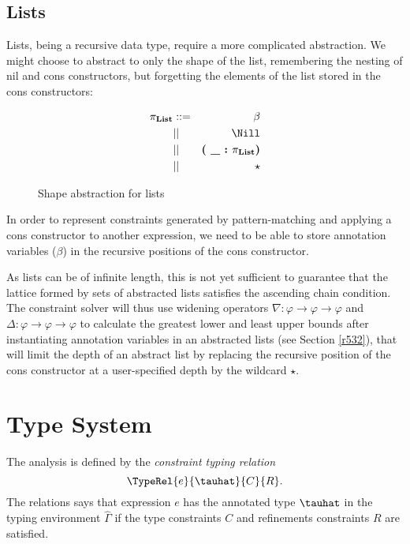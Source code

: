\subsection{Lists}

Lists, being a recursive data type, require a more complicated abstraction. We might choose to abstract to only the shape of the list, remembering the nesting of nil and cons constructors, but forgetting the elements of the list stored in the cons constructors:

\begin{figure}[h!t]
\begin{eqnarray*}
\pi_\mathbf{List} &::=& \beta                             \\
                  &||&  \Nill                             \\
                  &||&  \textbf{(\ \_\ :\ }\pi_\mathbf{List}\textbf{)} \\
                  &||&  \star
\end{eqnarray*}
\caption{Shape abstraction for lists}
\label{LatticeList}
\end{figure}

In order to represent constraints generated by pattern-matching and applying a cons constructor to another expression, we need to be able to store annotation variables ($\beta$) in the recursive positions of the cons constructor.

As lists can be of infinite length, this is not yet sufficient to guarantee that the lattice formed by sets of abstracted lists satisfies the ascending chain condition. The constraint solver will thus use widening operators $\nabla : \varphi \to \varphi \to \varphi$ and $\Delta : \varphi \to \varphi \to \varphi$ to calculate the greatest lower and least upper bounds after instantiating annotation variables in an abstracted lists (see Section \ref{r532}), that will limit the depth of an abstract list by replacing the recursive position of the cons constructor at a user-specified depth by the wildcard $\star$. %

\section{Type System}

The analysis is defined by the \emph{constraint typing relation} \[ \TypeRel{e}{\tauhat}{C}{R}. \] The relations says that expression $e$ has the annotated type $\tauhat$ in the typing environment $\widehat\Gamma$ if the type constraints $C$ and refinements constraints $R$ are satisfied.

